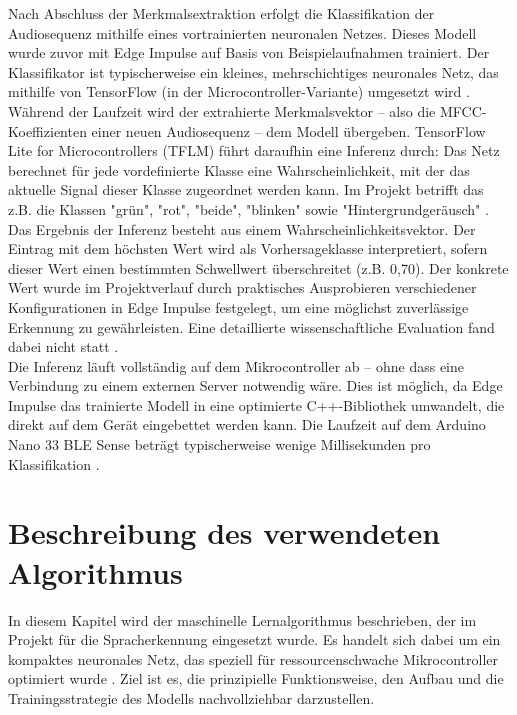 Nach Abschluss der Merkmalsextraktion erfolgt die Klassifikation der Audiosequenz mithilfe eines vortrainierten neuronalen Netzes. Dieses Modell wurde zuvor mit Edge Impulse auf Basis von Beispielaufnahmen trainiert. Der Klassifikator ist typischerweise ein kleines, mehrschichtiges neuronales Netz, das mithilfe von TensorFlow (in der Microcontroller-Variante) umgesetzt wird \cite{TensorFlow:2025LiteMicrocontrollers}.\\
\bigskip
Während der Laufzeit wird der extrahierte Merkmalsvektor – also die MFCC-Koeffizienten einer neuen Audiosequenz – dem Modell übergeben. TensorFlow Lite for Microcontrollers (TFLM) führt daraufhin eine Inferenz durch: Das Netz berechnet für jede vordefinierte Klasse eine Wahrscheinlichkeit, mit der das aktuelle Signal dieser Klasse zugeordnet werden kann. Im Projekt betrifft das z.B. die Klassen "grün", "rot", "beide", "blinken" sowie "Hintergrundgeräusch" \cite{EdgeImpulse:2025Deployment}.\\
\bigskip
Das Ergebnis der Inferenz besteht aus einem Wahrscheinlichkeitsvektor. Der Eintrag mit dem höchsten Wert wird als Vorhersageklasse interpretiert, sofern dieser Wert einen bestimmten Schwellwert überschreitet (z.B. 0,70). Der konkrete Wert wurde im Projektverlauf durch praktisches Ausprobieren verschiedener Konfigurationen in Edge Impulse festgelegt, um eine möglichst zuverlässige Erkennung zu gewährleisten. Eine detaillierte wissenschaftliche Evaluation fand dabei nicht statt \cite{EdgeImpulse:2025Deployment}.\\
\bigskip
Die Inferenz läuft vollständig auf dem Mikrocontroller ab – ohne dass eine Verbindung zu einem externen Server notwendig wäre. Dies ist möglich, da Edge Impulse das trainierte Modell in eine optimierte C++-Bibliothek umwandelt, die direkt auf dem Gerät eingebettet werden kann. Die Laufzeit auf dem Arduino Nano 33 BLE Sense beträgt typischerweise wenige Millisekunden pro Klassifikation \cite{TensorFlow:2025LiteMicrocontrollers} \cite{EdgeImpulse:2025Deployment}.



\section{Beschreibung des verwendeten Algorithmus}

In diesem Kapitel wird der maschinelle Lernalgorithmus beschrieben, der im Projekt für die Spracherkennung eingesetzt wurde. Es handelt sich dabei um ein kompaktes neuronales Netz, das speziell für ressourcenschwache Mikrocontroller optimiert wurde \cite{EdgeImpulse:2025LearningBlocks}. Ziel ist es, die prinzipielle Funktionsweise, den Aufbau und die Trainingsstrategie des Modells nachvollziehbar darzustellen.

